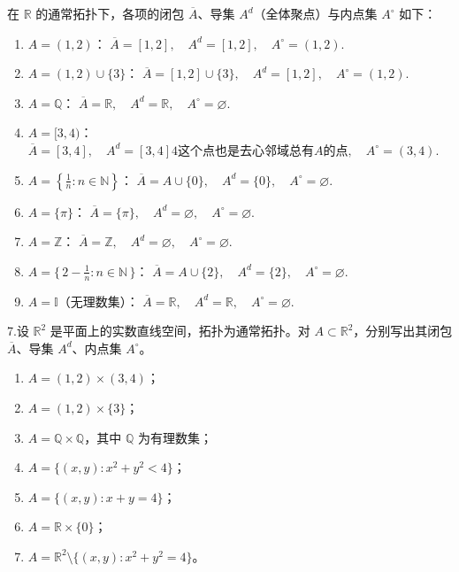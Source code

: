\begin{solution}
在 $\mathbb{R}$ 的通常拓扑下，各项的闭包 $\overline{A}$、导集 $A^{d}$（全体聚点）与内点集 $A^\circ$ 如下：
\begin{enumerate}[(1)]
\item $A=(1,2)$：\quad
$\overline{A}=[1,2],\quad A^{d}=[1,2],\quad A^\circ=(1,2)$.

\item $A=(1,2)\cup\{3\}$：\quad
$\overline{A}=[1,2]\cup\{3\},\quad A^{d}=[1,2],\quad A^\circ=(1,2)$.

\item $A=\mathbb{Q}$：\quad
$\overline{A}=\mathbb{R},\quad A^{d}=\mathbb{R},\quad A^\circ=\varnothing$.

\item $A=[3,4)$：\quad
$\overline{A}=[3,4],\quad A^{d}=[3,4]4这个点也是去心邻域总有A的点,\quad A^\circ=(3,4)$.

\item $A=\left\{\tfrac{1}{n}:n\in\mathbb{N}\right\}$：\quad
$\overline{A}=A\cup\{0\},\quad A^{d}=\{0\},\quad A^\circ=\varnothing$.

\item $A=\{\pi\}$：\quad
$\overline{A}=\{\pi\},\quad A^{d}=\varnothing,\quad A^\circ=\varnothing$.

\item $A=\mathbb{Z}$：\quad
$\overline{A}=\mathbb{Z},\quad A^{d}=\varnothing,\quad A^\circ=\varnothing$.

\item $A=\{\,2-\tfrac{1}{n}:n\in\mathbb{N}\,\}$：\quad
$\overline{A}=A\cup\{2\},\quad A^{d}=\{2\},\quad A^\circ=\varnothing$.

\item $A=\mathbb{I}$（无理数集）：\quad
$\overline{A}=\mathbb{R},\quad A^{d}=\mathbb{R},\quad A^\circ=\varnothing$.
\end{enumerate}
\end{solution}
\begin{exercise}
7.设 $\mathbb{R}^2$ 是平面上的实数直线空间，拓扑为通常拓扑。对 $A \subset \mathbb{R}^2$，分别写出其闭包 $\overline{A}$、导集 $A^{d}$、内点集 $A^{\circ}$。

\begin{enumerate}[(1)]
  \item $A = (1,2)\times(3,4)$；
  \item $A = (1,2)\times\{3\}$；
  \item $A = \mathbb{Q}\times\mathbb{Q}$，其中 $\mathbb{Q}$ 为有理数集；
  \item $A = \{(x,y): x^{2}+y^{2}<4\}$；
  \item $A = \{(x,y): x+y=4\}$；
  \item $A = \mathbb{R}\times\{0\}$；
  \item $A = \mathbb{R}^{2}\setminus\{(x,y):x^{2}+y^{2}=4\}$。
\end{enumerate}

\end{exercise}
